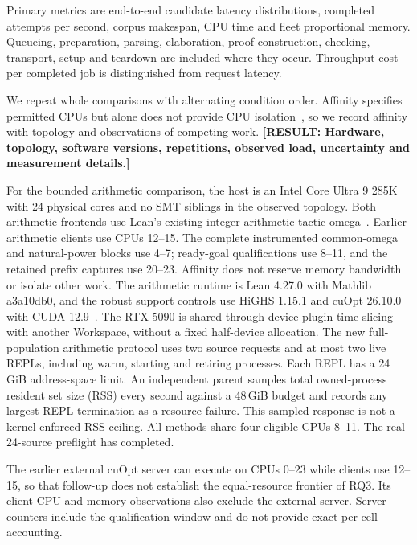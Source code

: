 \documentclass[10pt,twocolumn]{article}
\newcommand{\missing}[1]{\textbf{[RESULT: #1]}}
\begin{document}
Primary metrics are end-to-end candidate latency distributions, completed attempts per second, corpus makespan, CPU time and fleet proportional memory. Queueing, preparation, parsing, elaboration, proof construction, checking, transport, setup and teardown are included where they occur. Throughput cost per completed job is distinguished from request latency.

We repeat whole comparisons with alternating condition order. Affinity specifies permitted CPUs but alone does not provide CPU isolation~\cite{cpuAffinity}, so we record affinity with topology and observations of competing work. \missing{Hardware, topology, software versions, repetitions, observed load, uncertainty and measurement details.}


For the bounded arithmetic comparison, the host is an Intel Core Ultra 9 285K
with 24 physical cores and no SMT siblings in the observed topology.
Both arithmetic frontends use Lean's existing integer arithmetic tactic omega~\cite{lean427OmegaSource}. Earlier arithmetic clients use CPUs 12--15. The complete instrumented common-omega
and natural-power blocks use 4--7; ready-goal qualifications use 8--11, and
the retained prefix captures use 20--23.
Affinity does not reserve memory bandwidth or isolate other work.
The arithmetic runtime is Lean 4.27.0 with Mathlib a3a10db0, and the robust
support controls use HiGHS 1.15.1 and cuOpt 26.10.0 with CUDA 12.9~\cite{highsSimplex,nvidia-cuopt-2026}.
The RTX 5090 is shared through device-plugin time slicing with another
Workspace, without a fixed half-device allocation.
The new full-population arithmetic protocol uses two source requests and at most two live REPLs, including warm, starting and retiring processes. Each REPL has a 24\,GiB address-space limit. An independent parent samples total owned-process resident set size (RSS) every second against a 48\,GiB budget and records any largest-REPL termination as a resource failure. This sampled response is not a kernel-enforced RSS ceiling. All methods share four eligible CPUs 8--11. The real 24-source preflight has completed.

The earlier external cuOpt server can execute on CPUs 0--23 while clients use 12--15,
so that follow-up does not establish the equal-resource frontier of RQ3. Its client CPU and memory observations also exclude the external
server. Server counters include the qualification window and do not provide
exact per-cell accounting.
\end{document}
